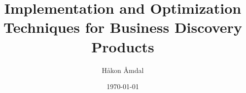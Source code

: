 \title{Implementation and Optimization Techniques for Business Discovery Products}
\author{Håkon Åmdal}
\date{\today}
